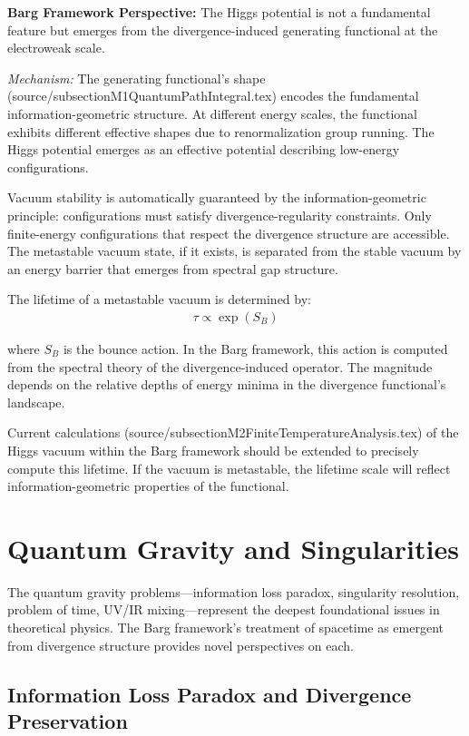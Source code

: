 \documentclass[12pt,a4paper]{article}
\begin{document}
\textbf{Barg Framework Perspective:} The Higgs potential is not a fundamental feature but emerges from the divergence-induced generating functional at the electroweak scale.

\textit{Mechanism:} The generating functional's shape (source/subsectionM1QuantumPathIntegral.tex) encodes the fundamental information-geometric structure. At different energy scales, the functional exhibits different effective shapes due to renormalization group running. The Higgs potential emerges as an effective potential describing low-energy configurations.

Vacuum stability is automatically guaranteed by the information-geometric principle: configurations must satisfy divergence-regularity constraints. Only finite-energy configurations that respect the divergence structure are accessible. The metastable vacuum state, if it exists, is separated from the stable vacuum by an energy barrier that emerges from spectral gap structure.

The lifetime of a metastable vacuum is determined by:
\begin{align}
\tau \propto \exp(S_B)
\end{align}

where $S_B$ is the bounce action. In the Barg framework, this action is computed from the spectral theory of the divergence-induced operator. The magnitude depends on the relative depths of energy minima in the divergence functional's landscape.

Current calculations (source/subsectionM2FiniteTemperatureAnalysis.tex) of the Higgs vacuum within the Barg framework should be extended to precisely compute this lifetime. If the vacuum is metastable, the lifetime scale will reflect information-geometric properties of the functional.

\section{Quantum Gravity and Singularities}

The quantum gravity problems---information loss paradox, singularity resolution, problem of time, UV/IR mixing---represent the deepest foundational issues in theoretical physics. The Barg framework's treatment of spacetime as emergent from divergence structure provides novel perspectives on each.

\subsection{Information Loss Paradox and Divergence Preservation}
\end{document}
